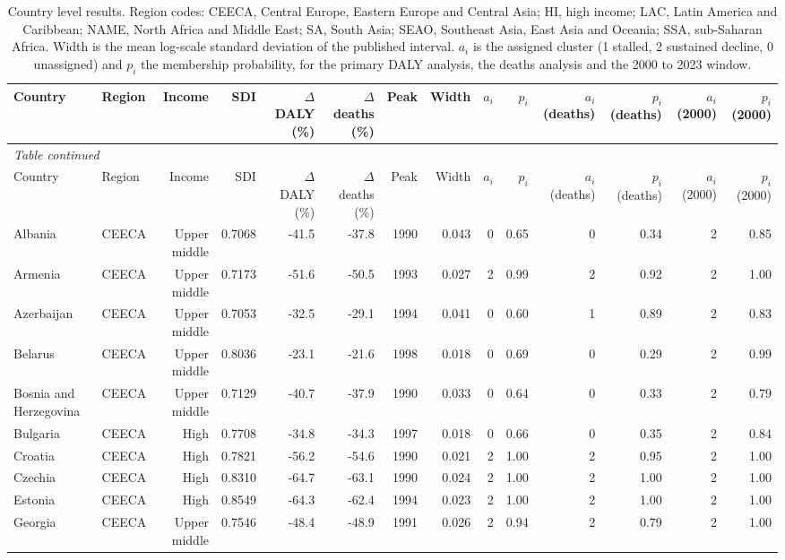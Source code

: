 \begin{longtable}{llrrrrrrrrrrrr}
\caption{Country level results. Region codes: CEECA, Central Europe, Eastern Europe and Central Asia; HI, high income; LAC, Latin America and Caribbean; NAME, North Africa and Middle East; SA, South Asia; SEAO, Southeast Asia, East Asia and Oceania; SSA, sub-Saharan Africa. Width is the mean log-scale standard deviation of the published interval. $a_i$ is the assigned cluster (1 stalled, 2 sustained decline, 0 unassigned) and $p_i$ the membership probability, for the primary DALY analysis, the deaths analysis and the 2000 to 2023 window.}\label{S1}\\
\toprule
Country & Region & Income & SDI & $\Delta$ DALY (\%) & $\Delta$ deaths (\%) & Peak & Width & $a_i$ & $p_i$ & $a_i$ (deaths) & $p_i$ (deaths) & $a_i$ (2000) & $p_i$ (2000) \\
\midrule
\endfirsthead
\multicolumn{14}{l}{\small\textit{Table \thetable{} continued}}\\
\toprule
Country & Region & Income & SDI & $\Delta$ DALY (\%) & $\Delta$ deaths (\%) & Peak & Width & $a_i$ & $p_i$ & $a_i$ (deaths) & $p_i$ (deaths) & $a_i$ (2000) & $p_i$ (2000) \\
\midrule
\endhead
\bottomrule
\endfoot
Albania & CEECA & Upper middle & 0.7068 & -41.5 & -37.8 & 1990 & 0.043 & 0 & 0.65 & 0 & 0.34 & 2 & 0.85 \\
Armenia & CEECA & Upper middle & 0.7173 & -51.6 & -50.5 & 1993 & 0.027 & 2 & 0.99 & 2 & 0.92 & 2 & 1.00 \\
Azerbaijan & CEECA & Upper middle & 0.7053 & -32.5 & -29.1 & 1994 & 0.041 & 0 & 0.60 & 1 & 0.89 & 2 & 0.83 \\
Belarus & CEECA & Upper middle & 0.8036 & -23.1 & -21.6 & 1998 & 0.018 & 0 & 0.69 & 0 & 0.29 & 2 & 0.99 \\
Bosnia and Herzegovina & CEECA & Upper middle & 0.7129 & -40.7 & -37.9 & 1990 & 0.033 & 0 & 0.64 & 0 & 0.33 & 2 & 0.79 \\
Bulgaria & CEECA & High & 0.7708 & -34.8 & -34.3 & 1997 & 0.018 & 0 & 0.66 & 0 & 0.35 & 2 & 0.84 \\
Croatia & CEECA & High & 0.7821 & -56.2 & -54.6 & 1990 & 0.021 & 2 & 1.00 & 2 & 0.95 & 2 & 1.00 \\
Czechia & CEECA & High & 0.8310 & -64.7 & -63.1 & 1990 & 0.024 & 2 & 1.00 & 2 & 1.00 & 2 & 1.00 \\
Estonia & CEECA & High & 0.8549 & -64.3 & -62.4 & 1994 & 0.023 & 2 & 1.00 & 2 & 1.00 & 2 & 1.00 \\
Georgia & CEECA & Upper middle & 0.7546 & -48.4 & -48.9 & 1991 & 0.026 & 2 & 0.94 & 2 & 0.79 & 2 & 1.00 \\

\end{longtable}

